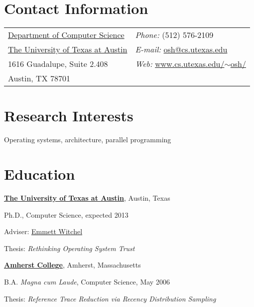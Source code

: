 
\section{Contact Information}
%
%
%
\newlength{\rcollength}\setlength{\rcollength}{2in}%
%
\begin{tabular}[t]{@{}p{\textwidth-\rcollength}p{\rcollength}}
\href{http://www.cs.utexas.edu/}{Department of Computer Science} &
   \textit{Phone:} (512) 576-2109 \\
\href{http://www.utexas.edu/}{The University of Texas at Austin} &
   \textit{E-mail:} \href{mailto:osh@cs.utexas.edu}{osh@cs.utexas.edu} \\
1616 Guadalupe, Suite 2.408 & \textit{Web:}
   \href{http://www.cs.utexas.edu/~osh/}{www.cs.utexas.edu/{\footnotesize$\sim$}osh/} \\
Austin, TX 78701 & \\
\end{tabular}

\section{Research Interests}
%
Operating systems, architecture, parallel programming

\section{Education}
%
\href{http://www.utexas.edu/}{\textbf{The University of Texas at Austin}},
Austin, Texas
\begin{outerlist}

\item[] Ph.D., Computer Science, expected 2013
        \begin{innerlist}
        \item Adviser:
              \href{http://www.cs.utexas.edu/~witchel/}
                   {Emmett Witchel}
        \item Thesis: {\em Rethinking Operating System Trust}
        \end{innerlist}

\end{outerlist}

\bigskip

\href{http://www.amherst.edu}{\textbf{Amherst College}}, Amherst,
Massachusetts
\begin{outerlist}
\item[] B.A. \emph{Magna cum Laude}, Computer Science, May 2006
        \begin{innerlist}
        \item Thesis: \emph{Reference Trace Reduction via Recency
Distribution Sampling}
        \end{innerlist}

\end{outerlist}
